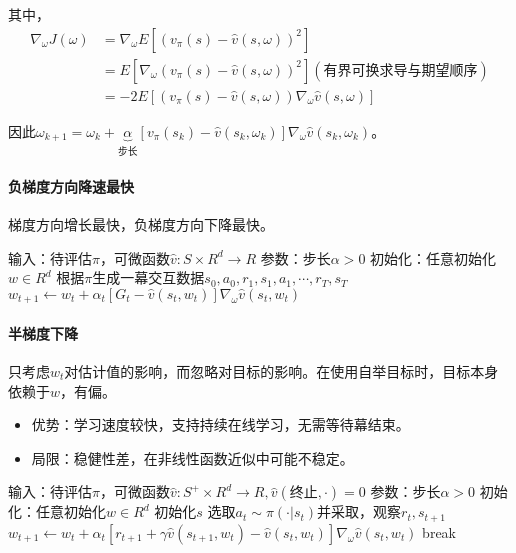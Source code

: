 \documentclass[
12pt, %
a4paper, 
oneside, %
headinclude,footinclude, %
]{scrartcl}
\begin{document}
其中，
\begin{align*}
\nabla_\omega J(\omega)
&= \nabla_\omega E[(v_\pi(s) - \hat{v}(s, \omega))^2] \\
&= E[\nabla_\omega (v_\pi(s) - \hat{v}(s, \omega))^2] (\text{有界可换求导与期望顺序}) \\
&= -2E[(v_\pi(s) - \hat{v}(s, \omega)) \nabla_\omega \hat{v}(s, \omega)]
\end{align*}

因此$ \omega_{k + 1} = \omega_k + \underbrace{\alpha}_{\text{步长}}[v_\pi(s_k) - \hat{v}(s_k, \omega_k)]\nabla_\omega \hat{v}(s_k, \omega_k) $。
\paragraph{负梯度方向降速最快}
梯度方向增长最快，负梯度方向下降最快。
\begin{myalgorithm}[梯度MC]
\State 输入：待评估$ \pi $，可微函数$ \hat{v}:S \times R^d \to R $
\State 参数：步长$ \alpha > 0 $
\State 初始化：任意初始化$ w \in R^d $
\Loop {}
\State 根据$ \pi $生成一幕交互数据$ s_0, a_0, r_1, s_1, a_1, \cdots, r_T, s_T $
\State $ w_{t + 1} \gets w_t + \alpha_t[G_t - \hat{v}(s_t, w_t)]\nabla_{\omega} \hat{v}(s_t, w_t)$
\EndFor
\EndLoop
\end{myalgorithm}
\paragraph{半梯度下降}
只考虑$ w_t $对估计值的影响，而忽略对目标的影响。在使用自举目标时，目标本身依赖于$ w $，有偏。
\begin{itemize}
\item 优势：学习速度较快，支持持续在线学习，无需等待幕结束。
\item 局限：稳健性差，在非线性函数近似中可能不稳定。
\end{itemize}
\begin{myalgorithm}[半梯度TD($ 0 $)]
\State 输入：待评估$ \pi $，可微函数$ \hat{v}:S^+ \times R^d \to R, \hat{v}(\text{终止}, \cdot) = 0 $
\State 参数：步长$ \alpha > 0 $
\State 初始化：任意初始化$ w \in R^d $
\Loop {}
\State 初始化$ s $
\State 选取$ a_t \sim \pi(\cdot|s_t) $并采取，观察$ r_t, s_{t + 1} $
\State $ w_{t + 1} \gets w_t + \alpha_t[r_{t + 1} + \gamma\hat{v}(s_{t + 1}, w_t) - \hat{v}(s_t, w_t)]\nabla_{\omega} \hat{v}(s_t, w_t) $
\State break
\EndIf
\EndFor
\EndLoop
\end{myalgorithm}
\end{document}
